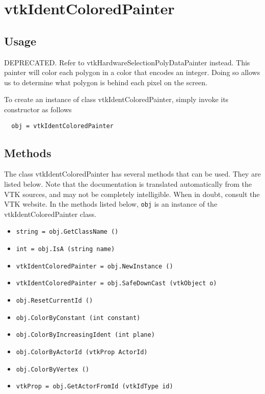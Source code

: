 \section{vtkIdentColoredPainter}

\subsection{Usage}

 DEPRECATED. Refer to vtkHardwareSelectionPolyDataPainter instead.
 This painter will color each polygon in a color that encodes an integer.
 Doing so allows us to determine what polygon is behind each pixel on the 
 screen.

To create an instance of class vtkIdentColoredPainter, simply
invoke its constructor as follows
\begin{verbatim}
  obj = vtkIdentColoredPainter
\end{verbatim}
\subsection{Methods}

The class vtkIdentColoredPainter has several methods that can be used.
  They are listed below.
Note that the documentation is translated automatically from the VTK sources,
and may not be completely intelligible.  When in doubt, consult the VTK website.
In the methods listed below, \verb|obj| is an instance of the vtkIdentColoredPainter class.
\begin{itemize}
\item  \verb|string = obj.GetClassName ()|

\item  \verb|int = obj.IsA (string name)|

\item  \verb|vtkIdentColoredPainter = obj.NewInstance ()|

\item  \verb|vtkIdentColoredPainter = obj.SafeDownCast (vtkObject o)|

\item  \verb|obj.ResetCurrentId ()|

\item  \verb|obj.ColorByConstant (int constant)|

\item  \verb|obj.ColorByIncreasingIdent (int plane)|

\item  \verb|obj.ColorByActorId (vtkProp ActorId)|

\item  \verb|obj.ColorByVertex ()|

\item  \verb|vtkProp = obj.GetActorFromId (vtkIdType id)|

\end{itemize}
